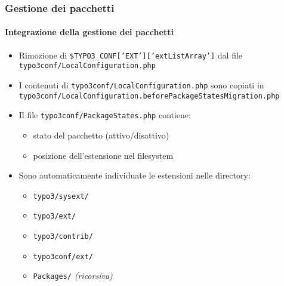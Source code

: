 
\begin{frame}[fragile]
	\frametitle{Gestione dei pacchetti}
	\framesubtitle{Integrazione della gestione dei pacchetti}

	\begin{itemize}
		\item Rimozione di \texttt{\$TYPO3\_CONF['EXT']['extListArray']} dal file\newline
			\smaller\texttt{typo3conf/LocalConfiguration.php}\normalsize

		\item I contenuti di \small\texttt{typo3conf/LocalConfiguration.php} sono copiati in\normalsize\newline
			\smaller\texttt{typo3conf/LocalConfiguration.beforePackageStatesMigration.php}\normalsize

		\item Il file \texttt{typo3conf/PackageStates.php} contiene:

			\begin{itemize}
				\item stato del pacchetto (attivo/disattivo)
				\item posizione dell'estensione nel filesystem
			\end{itemize}

		\item Sono automaticamente individuate le estensioni nelle directory:

			\begin{itemize}
				\item \texttt{typo3/sysext/}
				\item \texttt{typo3/ext/}
				\item \texttt{typo3/contrib/}
				\item \texttt{typo3conf/ext/}
				\item \texttt{Packages/} \emph{(ricorsiva)}
			\end{itemize}

	\end{itemize}

\end{frame}



